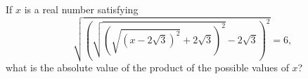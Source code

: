 If $x$ is a real number satisfying
\[\sqrt{\left(\sqrt{\left(\sqrt{\left(x-2\sqrt3\right)^2}+2\sqrt3\right)^2}-2\sqrt3\right)^2}=6,\]
what is the absolute value of the product of the possible values of $x$?
